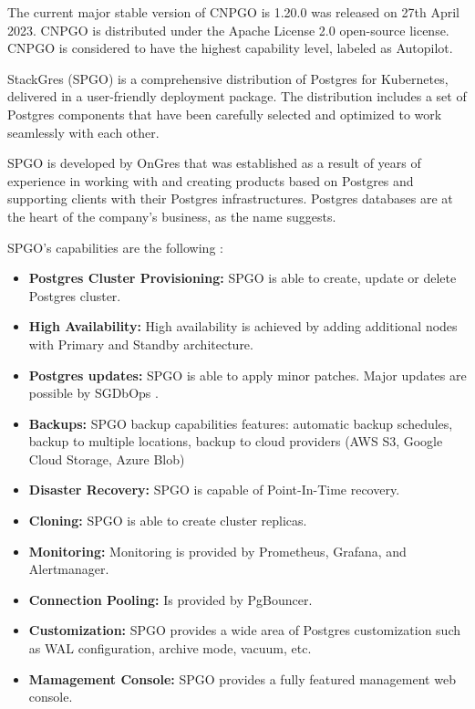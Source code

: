 
The current major stable version of CNPGO is 1.20.0 was released on 27th April 2023. \cite{CNPGreleases} CNPGO is distributed under the Apache License 2.0 open-source license. CNPGO is considered to have the highest capability level, labeled as Autopilot. \cite{CNPGdocu}

StackGres (SPGO) is a comprehensive distribution of Postgres for Kubernetes, delivered in a user-friendly deployment package. The distribution includes a set of Postgres components that have been carefully selected and optimized to work seamlessly with each other. \cite{SPGOgitlab}

SPGO is developed by OnGres that was established as a result of years of experience in working with and creating products based on Postgres and supporting clients with their Postgres infrastructures. Postgres databases are at the heart of the company's business, as the name suggests. \cite{OnGres}

SPGO’s capabilities are the following \cite{OnGres}:
\begin{itemize}
    \item \textbf{Postgres Cluster Provisioning:} SPGO is able to create, update or delete Postgres cluster.
    \item \textbf{High Availability:} High availability is achieved by adding additional nodes with Primary and Standby architecture.
    \item \textbf{Postgres updates:} SPGO is able to apply minor patches. Major updates are possible by SGDbOps \cite{SPGODocuMajorUpdates}.
    \item \textbf{Backups:} SPGO backup capabilities features: automatic backup schedules, backup to multiple locations, backup to cloud providers (AWS S3, Google Cloud Storage, Azure Blob)
    \item \textbf{Disaster Recovery:} SPGO is capable of Point-In-Time recovery.
    \item \textbf{Cloning:} SPGO is able to create cluster replicas.
    \item \textbf{Monitoring:} Monitoring is provided by Prometheus, Grafana, and Alertmanager.
    \item \textbf{Connection Pooling:} Is provided by PgBouncer.
    \item \textbf{Customization:} SPGO provides a wide area of Postgres customization such as WAL configuration, archive mode, vacuum, etc. \cite{SPGODocuCustomization}
    \item \textbf{Mamagement Console:} SPGO provides a fully featured management web console.

\end{itemize}

